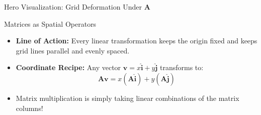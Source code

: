 \documentclass[../m00-session-02.tex]{subfiles}
\begin{document}
\begin{frame}{Hero Visualization: Grid Deformation Under $\mathbf{A}$}
{%
  }{Matrices as Spatial Operators}{%
    \begin{itemize}\setlength{\itemsep}{0.25em}
      \item \textbf{Line of Action:} Every linear transformation keeps the origin fixed and keeps grid lines parallel and evenly spaced.
      \item \textbf{Coordinate Recipe:} Any vector $\mathbf{v} = x\hat{\mathbf{i}} + y\hat{\mathbf{j}}$ transforms to:
        \[
        \mathbf{A}\mathbf{v} = x(\mathbf{A}\hat{\mathbf{i}}) + y(\mathbf{A}\hat{\mathbf{j}})
        \]
      \item Matrix multiplication is simply taking linear combinations of the matrix columns!
    \end{itemize}
  }
\end{frame}
\end{document}
